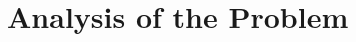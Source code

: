 \documentclass{mcmthesis}
\begin{document}



\section{Analysis of the Problem}







\end{document}
